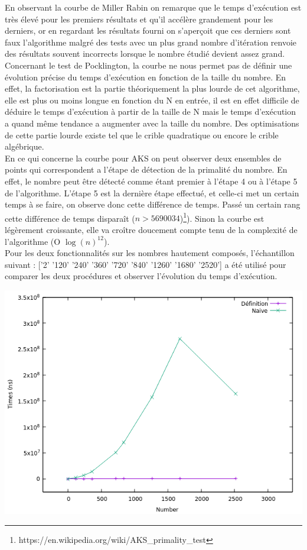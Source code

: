 	En observant la courbe de Miller Rabin on remarque que le temps d'exécution est très élevé pour les premiers résultats et qu'il accélère grandement pour les derniers, or en regardant les résultats fourni on s'aperçoit que ces derniers sont faux l'algorithme malgré des tests avec un plus grand nombre d'itération renvoie des résultats souvent incorrects lorsque le nombre étudié devient assez grand.\\		
		
		Concernant le test de Pocklington, la courbe ne nous permet pas de définir une évolution précise du temps d'exécution en fonction de la taille du nombre. En effet, la factorisation est la partie théoriquement la plus lourde de cet algorithme, elle est plus ou moins longue en fonction du N en entrée, il est en effet difficile de déduire le temps d’exécution à partir de la taille de N mais le temps d'exécution a quand même tendance a augmenter avec la taille du nombre. Des optimisations de cette partie lourde existe tel que le crible quadratique ou encore le crible algébrique.\\		
		
		En ce qui concerne la courbe pour AKS on peut observer deux ensembles de points qui correspondent a l'étape de détection de la primalité du nombre. En effet, le nombre peut être  détecté comme étant premier à l'étape 4 ou à l'étape 5 de l'algorithme. L'étape 5 est la dernière étape effectué, et celle-ci met un certain temps à se faire, on observe donc cette différence de temps. Passé un certain rang cette différence de temps disparaît ($n > 5690034$)\footnote{https://en.wikipedia.org/wiki/AKS\_primality\_test}).
Sinon la courbe est légèrement croissante, elle va croître doucement compte tenu de la complexité de l’algorithme (O $\log(n)^{12}$).\\

	Pour les deux fonctionnalités sur les nombres hautement composés, l'échantillon suivant : ['2' '120' '240' '360' '720' '840' '1260' '1680' '2520'] a été utilisé pour comparer les deux procédures et observer l'évolution du temps d'exécution.\\
	\begin{center}\includegraphics[scale=0.5]{HC.png}\end{center}
	
